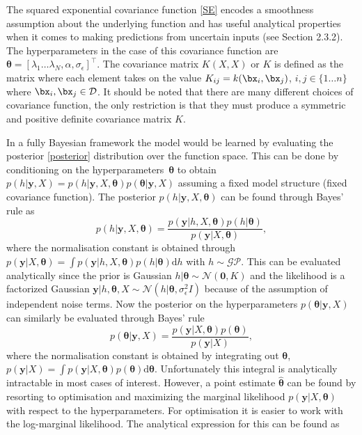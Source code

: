 The squared exponential covariance function \eqref{SE} encodes a smoothness assumption about the underlying function and has useful analytical properties when it comes to making predictions from uncertain inputs (see Section 2.3.2). The hyperparameters in the case of this covariance function are $\boldsymbol{\theta}=[\lambda_{1}\dots \lambda_{N},\alpha,\sigma_\epsilon]^\top$. The covariance matrix $K(X,X)$ or $K$ is defined as the matrix where each element takes on the value $K_{ij}=k(\bx_i,\bx_j)$, $i,j \in \{1\dots n\}$ where $\bx_i,\bx_j \in \mathcal{D}$. It should be noted that there are many different choices of covariance function, the only restriction is that they must produce a symmetric and positive definite covariance matrix $K$.



In a fully Bayesian framework the model would be learned by evaluating the posterior \eqref{posterior} distribution over the function space. This can be done by conditioning on the hyperparameters~$\boldsymbol{\theta}$ to obtain $p(h|\mathbf{y},X)=p(h|\mathbf{y},X,\boldsymbol{\theta})p(\boldsymbol{\theta}|\mathbf{y},X)$ assuming a fixed model structure (fixed covariance function). The posterior $p(h|\mathbf{y},X,\boldsymbol{\theta})$ can be found through Bayes' rule as
\begin{equation}
p(h|\mathbf{y},X,\boldsymbol{\theta}) = 
\frac{p(\mathbf{y}|h,X,\boldsymbol{\theta})p(h|\boldsymbol{\theta})}
        {p(\mathbf{y}|X,\boldsymbol{\theta})},
\end{equation}
where the normalisation constant is obtained through $p(\mathbf{y}|X,\boldsymbol{\theta})=\int p(\mathbf{y}|h,X,\boldsymbol{\theta})p(h|\boldsymbol{\theta})\mathrm{d}h$ with $h \sim \mathcal{GP}$. This can be evaluated analytically since the prior is Gaussian $h|\boldsymbol{\theta} \sim \mathcal{N}(\mathbf{0},K)$ and the likelihood is a factorized Gaussian $\mathbf{y}|h,\boldsymbol{\theta},X \sim \mathcal{N}(h|\boldsymbol{\theta},\sigma^2_\epsilon I)$ because of the assumption of independent noise terms. Now the posterior on the hyperparameters $p(\boldsymbol{\theta}|\mathbf{y},X)$ can similarly be evaluated through Bayes' rule
\begin{equation}
p(\boldsymbol{\theta}|\mathbf{y},X) = 
\frac{p(\mathbf{y}|X,\boldsymbol{\theta})p(\boldsymbol{\theta})}
        {p(\mathbf{y}|X)},
\end{equation}
where the normalisation constant is obtained by integrating out $\boldsymbol{\theta}$, $p(\mathbf{y}|X)=\int p(\mathbf{y}|X,\boldsymbol{\theta})p(\boldsymbol{\theta})\mathrm{d}\boldsymbol{\theta}$. Unfortunately this integral is analytically intractable in most cases of interest. However, a point estimate $\boldsymbol{\hat{\theta}}$ can be found by resorting to optimisation and maximizing the marginal likelihood $p(\mathbf{y}|X,\boldsymbol{\theta})$ with respect to the hyperparameters. For optimisation it is easier to work with the log-marginal likelihood. The analytical expression for this can be found as
